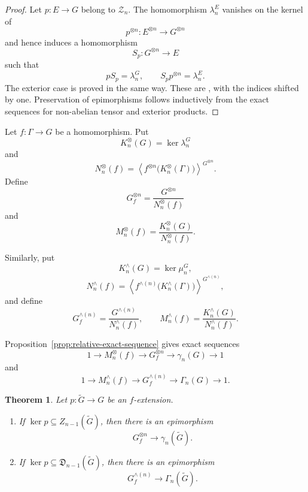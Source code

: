 \documentclass[10pt]{amsart}
\newtheorem{theorem}{Theorem}[section]
\renewcommand{\*}{\cdot {\dots} \cdot}
\newcommand{\?}[1]{\overset{?}{#1}}
\numberwithin{equation}{section}
\begin{document}
\begin{proof}
Let $p\colon E\to G$ belong to $\mathcal Z_n$. The
homomorphism $\lambda_n^E$ vanishes on the kernel of
\[
p^{\otimes n}\colon E^{\otimes n}\longrightarrow G^{\otimes n}
\]
and hence induces a homomorphism
\[
S_p\colon G^{\otimes n}\longrightarrow E
\]
such that
\[
pS_p=\lambda_n^G,
\qquad
S_pp^{\otimes n}=\lambda_n^E.
\]
The exterior case is proved in the same way. These are
\cite[Lemmas~3.1 and~3.7]{DonadzeGarciaMartinez2021}, with
the indices shifted by one. Preservation of epimorphisms
follows inductively from the exact sequences for
non-abelian tensor and exterior products.
\end{proof}

Let $f\colon\Gamma\to G$ be a homomorphism. Put
\[
K_n^{\otimes}(G)=\ker\lambda_n^G
\]
and
\[
N_n^{\otimes}(f)=
\left\langle
f^{\otimes n}\bigl(K_n^{\otimes}(\Gamma)\bigr)
\right\rangle^{G^{\otimes n}}.
\]
Define
\[
G_f^{\otimes n}
=
\frac{G^{\otimes n}}{N_n^{\otimes}(f)}
\]
and
\[
M_n^{\otimes}(f)
=
\frac{K_n^{\otimes}(G)}{N_n^{\otimes}(f)}.
\]

Similarly, put
\[
K_n^{\wedge}(G)=\ker\mu_n^G,
\]
\[
N_n^{\wedge}(f)=
\left\langle
f^{\wedge(n)}\bigl(K_n^{\wedge}(\Gamma)\bigr)
\right\rangle^{G^{\wedge(n)}},
\]
and define
\[
G_f^{\wedge(n)}
=
\frac{G^{\wedge(n)}}{N_n^{\wedge}(f)},
\qquad
M_n^{\wedge}(f)
=
\frac{K_n^{\wedge}(G)}{N_n^{\wedge}(f)}.
\]

Proposition~\ref{prop:relative-exact-sequence} gives exact
sequences
\[
1\longrightarrow M_n^{\otimes}(f)
\longrightarrow G_f^{\otimes n}
\longrightarrow\gamma_n(G)
\longrightarrow1
\]
and
\[
1\longrightarrow M_n^{\wedge}(f)
\longrightarrow G_f^{\wedge(n)}
\longrightarrow\Gamma_n(G)
\longrightarrow1.
\]

\begin{theorem}\label{thm:relative-tensor-exterior}
Let $p\colon\widetilde G\longrightarrow G$ be an $f$-extension.

\begin{enumerate}
\item
If $\ker p\subseteq Z_{n-1}(\widetilde G)$,
then there is an epimorphism
\[
G_f^{\otimes n}
\longrightarrow
\gamma_n(\widetilde G).
\]

\item
If $\ker p\subseteq\mathfrak D_{n-1}(\widetilde G)$,
then there is an epimorphism
\[
G_f^{\wedge(n)}
\longrightarrow
\Gamma_n(\widetilde G).
\]
\end{enumerate}
\end{theorem}
\end{document}
